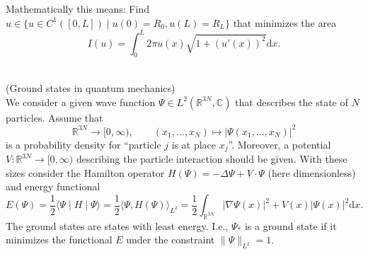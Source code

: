 \begin{example}
\begin{itemize}
\begin{center}
	\end{center}

	Mathematically this means: Find $u\in\{u\in C^1([0,L])\mid u(0)=R_0,u(L)=R_L\}$ that minimizes the area
	\[I(u)=\int_0^L{2\pi u(x)\sqrt{1+(u'(x))^2}\mathrm{d}x}.\]\\
\end{itemize}
\end{example}

\begin{example}
(Ground states in quantum mechanics)\\
We consider a given wave function $\Psi\in L^2(\mathbb{R}^{3N},\mathbb{C})$ that describes the state of $N$ particles. Assume that
\[\mathbb{R}^{3N}\longrightarrow[0,\infty),\qquad(x_1,\dotsc,x_N)\longmapsto\lvert\Psi(x_1,\dotsc,x_N)\rvert^2\]
is a probability density for ``particle $j$ is at place $x_j$''. Moreover, a potential $V:\mathbb{R}^{3N}\longrightarrow[0,\infty)$ describing the particle interaction should be given. With these sizes consider the Hamilton operator $H(\Psi)=-\Delta\Psi+V\cdot\Psi$ (here dimensionless) and energy functional
\[E(\Psi)=\frac{1}{2}\langle\Psi\mid H\mid\Psi\rangle=\frac{1}{2}\langle\Psi,H(\Psi)\rangle_{L^2}=\frac{1}{2}\int_{\mathbb{R}^{3N}}{\lvert\nabla\Psi(x)\rvert^2+V(x)\lvert\Psi(x)\rvert^2\mathrm{d}x}.\]
The ground states are states with least energy. I.e., $\Psi_*$ is a ground state if it minimizes the functional $E$ under the constraint $\lVert\Psi\rVert_{L^2}=1$.
\end{example}